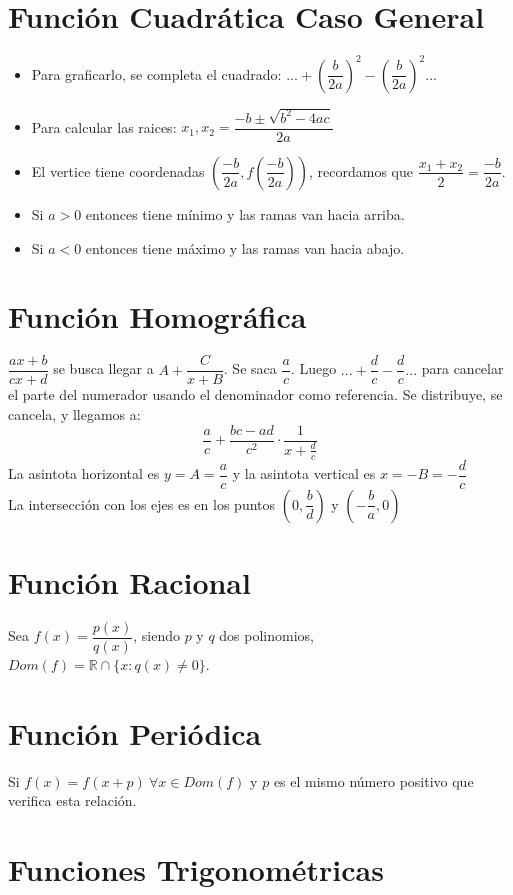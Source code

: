 \documentclass[11pt,a4paper]{article}
\begin{document}
\section{Funci\'on Cuadr\'atica Caso General}
\begin{itemize}
\item Para graficarlo, se completa el cuadrado: $... + \left(\dfrac{b}{2a}\right)^2 - \left(\dfrac{b}{2a}\right)^2...$
\item Para calcular las raices: $x_1, x_2 = \dfrac{-b \pm \sqrt{b^2 - 4ac}}{2a}$
\item El vertice tiene coordenadas $\left(\dfrac{-b}{2a}, f(\dfrac{-b}{2a})\right)$, recordamos que $\dfrac{x_1 + x_2}{2} = \dfrac{-b}{2a}$.
\item Si $a > 0$ entonces tiene m\'inimo y las ramas van hacia arriba.
\item Si $a < 0$ entonces tiene m\'aximo y las ramas van hacia abajo.
\end{itemize}

\section{Funci\'on Homogr\'afica}
$\dfrac{ax+b}{cx+d}$ se busca llegar a $A + \dfrac{C}{x+B}$. Se saca $\dfrac{a}{c}$. Luego $...+\dfrac{d}{c}-\dfrac{d}{c}...$ para cancelar el parte del numerador usando el denominador como referencia. Se distribuye, se cancela, y llegamos a:
$$\dfrac{a}{c} + \dfrac{bc-ad}{c^2} \cdot \dfrac{1}{x + \frac{d}{c}}$$
La asintota horizontal es $y = A = \dfrac{a}{c}$ y la asintota vertical es $x = -B = -\dfrac{d}{c}$\\

La intersecci\'on con los ejes es en los puntos $(0, \dfrac{b}{d})$ y $(-\dfrac{b}{a}, 0)$


\section{Funci\'on Racional}
Sea $f(x) = \dfrac{p(x)}{q(x)}$, siendo $p$ y $q$ dos polinomios, $Dom(f) = \mathbb{R} \cap \{x:q(x)\not = 0\}$.

\newpage

\section{Funci\'on Peri\'odica}
Si $f(x) = f(x + p)\ \forall x \in Dom(f)$ y $p$ es el mismo n\'umero positivo que verifica esta relaci\'on.

\section{Funciones Trigonom\'etricas}
\end{document}
